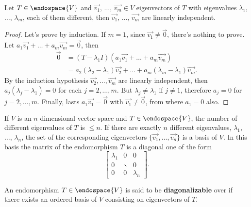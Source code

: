 \begin{prop}
    Let $T\in\endospace{V}$ and $\vec{v_1}$, $\ldots$, $\vec{v_m}\in V$ eigenvectors of $T$ with eigenvalues
    $\lambda_1$, $\ldots$, $\lambda_m$, each of them different, then $\vec{v_1}$, $\ldots$, $\vec{v_m}$
    are linearly independent.
\end{prop}

\begin{proof}
    Let's prove by induction. If $m = 1$, since $\vec{v_1}\neq\vec{0}$, there's nothing to prove. Let
    $a_1\vec{v_1} + \ldots + a_m\vec{v_m} = \vec{0}$, then
    \begin{align}
        \vec{0} &= \left( T - \lambda_1 I \right)\left( a_1\vec{v_1} + \ldots + a_m\vec{v_m} \right) \\ &=
        a_2\left( \lambda_2 - \lambda_1 \right)\vec{v_2} + \ldots + a_m\left( \lambda_m - \lambda_1
        \right)\vec{v_m}.
    \end{align}
    By the induction hypothesis $\vec{v_2}, \ldots, \vec{v_m}$ are linearly independent, then $a_j\left(
    \lambda_j - \lambda_1\right) = 0$ for each $j = 2, \ldots, m$. But $\lambda_j\neq\lambda_1$ if
    $j\neq 1$, therefore $a_j = 0$ for $j = 2, \ldots, m$. Finally, lasts $a_1\vec{v_1} = \vec{0}$ with
    $\vec{v_1}\neq \vec{0}$, from where $a_1 = 0$ also.
\end{proof}

\begin{coro}
    If $V$ is an $n$-dimensional vector space and $T\in\endospace{V}$, the number of different eigenvalues
    of $T$ is $\leq n$. If there are exactly $n$ different eigenvalues, $\lambda_1$, $\ldots$, $\lambda_n$,
    the set of the corresponding eigenvectors $\{\vec{v_1}, \ldots, \vec{v_n}\}$ is a basis of $V$. In
    this basis the matrix of the endomorphism $T$ is a diagonal one of the form
    \begin{equation}
        \begin{bmatrix} \lambda_1 & 0 & 0 \\ 0 & \ddots & 0 \\ 0 & 0 & \lambda_n \end{bmatrix}.
    \end{equation}
\end{coro}

\begin{defn}
    An endomorphism $T\in\endospace{V}$ is said to be \textbf{diagonalizable} over \field if there exists an
    ordered basis of $V$ consisting on eigenvectors of $T$.
\end{defn}

